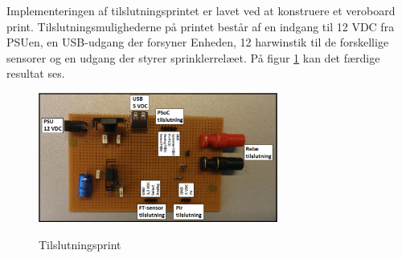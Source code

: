 Implementeringen af tilslutningsprintet er lavet ved at konstruere et veroboard print. Tilslutningsmulighederne på printet består af en indgang til 12 VDC fra PSUen, en USB-udgang der forsyner Enheden, 12 harwinstik til de forskellige sensorer og en udgang der styrer sprinklerrelæet. På figur \ref{lab:Tilslutningsprint} kan det færdige resultat ses. 

\begin{figure}[htb]
\centering
{\includegraphics[width=0.70\textwidth]{filer/pics/Tilslutningsprint}}
\caption{Tilslutningsprint}
\label{lab:Tilslutningsprint}
\end{figure}



